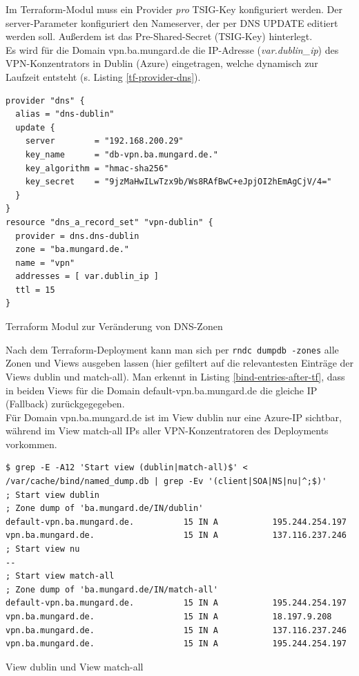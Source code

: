 Im Terraform-Modul muss ein Provider \textit{pro} \gls{TSIG}-Key konfiguriert werden. Der server-Parameter konfiguriert den Nameserver, der per \gls{DNS} UPDATE editiert werden soll. Außerdem ist das Pre-Shared-Secret (\gls{TSIG}-Key) hinterlegt.\\
Es wird für die Domain vpn.ba.mungard.de die IP-Adresse (\textit{var.dublin\_ip}) des VPN-Konzen\-trators in Dublin (Azure) eingetragen, welche dynamisch zur Laufzeit entsteht (s. Listing \ref{tf-provider-dns}).
\begin{listing}[h]
\begin{verbatim}
provider "dns" {
  alias = "dns-dublin"
  update {
    server        = "192.168.200.29"
    key_name      = "db-vpn.ba.mungard.de."
    key_algorithm = "hmac-sha256"
    key_secret    = "9jzMaHwILwTzx9b/Ws8RAfBwC+eJpjOI2hEmAgCjV/4="
  }
}
resource "dns_a_record_set" "vpn-dublin" {
  provider = dns.dns-dublin
  zone = "ba.mungard.de."
  name = "vpn"
  addresses = [ var.dublin_ip ]
  ttl = 15
}
\end{verbatim}
\caption{Terraform Modul zur Veränderung von DNS-Zonen}
\label{tf-provider-dns}
\end{listing}\FloatBarrier
Nach dem Terraform-\gls{Deployment} kann man sich per \texttt{rndc dumpdb -zones} alle \gls{Zone}n und \gls{View}s ausgeben lassen (hier gefiltert auf die relevantesten Einträge der \gls{View}s \glqq dublin\grqq{} und \glqq match-all\grqq{}). Man erkennt in Listing \ref{bind-entries-after-tf}, dass in beiden \gls{View}s für die Domain default-vpn.ba.mungard.de die gleiche IP (\glqq \gls{Fallback}\grqq{}) zurückgegegeben.\\
Für Domain vpn.ba.mungard.de ist im \gls{View} \glqq dublin\grqq{} nur eine Azure-IP sichtbar, während im \gls{View} \glqq match-all\grqq{} IPs aller \gls{VPN-Konzentrator}en des \gls{Deployment}s vorkommen.
\begin{listing}[h]
\begin{verbatim}
$ grep -E -A12 'Start view (dublin|match-all)$' < /var/cache/bind/named_dump.db | grep -Ev '(client|SOA|NS|nu|^;$)'
; Start view dublin
; Zone dump of 'ba.mungard.de/IN/dublin'
default-vpn.ba.mungard.de.          15 IN A           195.244.254.197
vpn.ba.mungard.de.                  15 IN A           137.116.237.246
; Start view nu
--
; Start view match-all
; Zone dump of 'ba.mungard.de/IN/match-all'
default-vpn.ba.mungard.de.          15 IN A           195.244.254.197
vpn.ba.mungard.de.                  15 IN A           18.197.9.208
vpn.ba.mungard.de.                  15 IN A           137.116.237.246
vpn.ba.mungard.de.                  15 IN A           195.244.254.197

\end{verbatim}
\caption{View \glqq dublin\grqq{} und View \glqq match-all\grqq{}}
\label{bind-entries-after-tf}
\end{listing}\FloatBarrier

